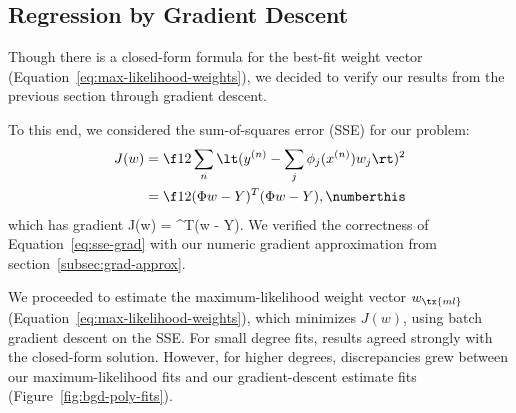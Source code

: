 \documentclass{article}
\begin{document}
\begin{multicols}{2}
\subsection{Regression by Gradient Descent}

Though there is a closed-form formula for the best-fit weight vector (Equation~\ref{eq:max-likelihood-weights}), we decided to verify our results from the previous section through gradient descent.

To this end, we considered the sum-of-squares error (SSE) for our problem:
\begin{align*}
J(w) &= \f12 \sum_n \lt(y^{(n)} - \sum_j\phi_j(x^{(n)}) w_j\rt)^2 \\
&= \f12 (\Phi w - Y)^T(\Phi w - Y), \label{eq:sse}\numberthis
\end{align*}
which has gradient
\beq
\label{eq:sse-grad}
\nabla J(w) = \Phi^T(\Phi w - Y).
\eeq
We verified the correctness of Equation~\ref{eq:sse-grad} with our numeric gradient approximation from section~\ref{subsec:grad-approx}.

We proceeded to estimate the maximum-likelihood weight vector $w_\tx{ml}$ (Equation~\ref{eq:max-likelihood-weights}), which minimizes $J(w)$, using batch gradient descent on the SSE.
For small degree fits, results agreed strongly with the closed-form solution.
However, for higher degrees, discrepancies grew between our maximum-likelihood fits and our gradient-descent estimate fits (Figure~\ref{fig:bgd-poly-fits}).


\end{multicols}
\end{document}
